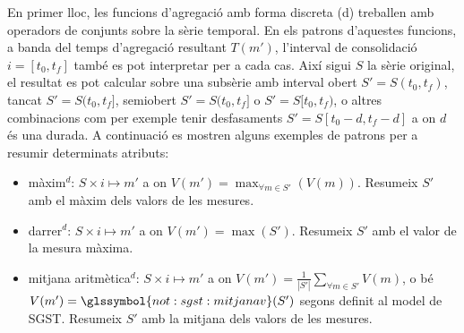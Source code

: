 En primer lloc, les funcions d'agregació amb forma discreta (d)
treballen amb operadors de conjunts sobre la sèrie temporal. En els
patrons d'aquestes funcions, a banda del temps d'agregació resultant
$T(m')$, l'interval de consolidació $i=[t_0,t_f]$ també es pot
interpretar per a cada cas. Així sigui $S$ la sèrie original, el
resultat es pot calcular sobre una subsèrie amb interval obert
$S'=S(t_0,t_f)$, tancat $S'=S(t_0,t_f]$, semiobert $S'=S(t_0,t_f]$ o
$S'=S[t_0,t_f)$, o altres combinacions com per exemple tenir
desfasaments $S'=S[t_0-d,t_f-d]$ a on $d$ és una durada. A continuació
es mostren alguns exemples de patrons per a resumir determinats
atributs:
\begin{itemize}
\item màxim$^d$: $S \times i \mapsto m'$ a on $V(m') = \max_{\forall m
    \in S'}(V(m))$. Resumeix $S'$ amb el màxim dels valors de les
  mesures.


\item darrer$^d$: $S \times i \mapsto m'$ a on $V(m') =
  \max(S')$. Resumeix $S'$ amb el valor de la mesura màxima.
\item mitjana aritmètica$^d$: $S \times i \mapsto m'$ a on $V(m') =
  \frac{1}{|S'|} \sum\limits_{\forall m\in S'} V(m)$, o bé $V(m') =
  \glssymbol{not:sgst:mitjanav}(S')$ segons definit al model de
  \gls{SGST}. Resumeix $S'$ amb la mitjana dels valors de les mesures.
\end{itemize}


